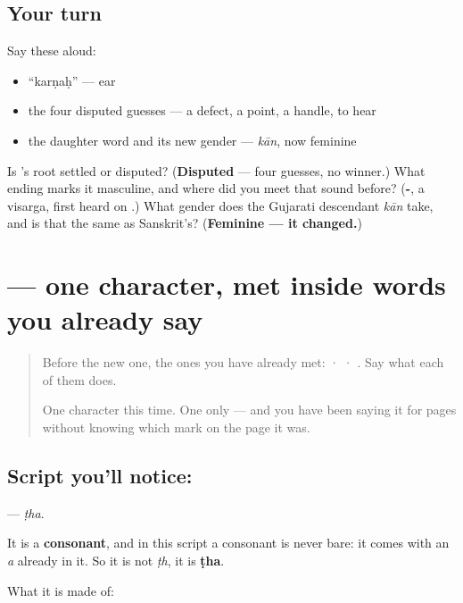 \subsection*{Your turn}
Say these aloud:

\begin{itemize}
\raggedright
  \item \textquotedblleft{}karṇaḥ\textquotedblright{} — ear
  \item the four disputed guesses — a defect, a point, a handle, to hear
  \item the daughter word and its new gender — \emph{kān}, now feminine
\end{itemize}

\begin{tcolorbox}[breakable,colback=teal!4,colframe=teal!35!black,title={Before you move on}]
Is 's root settled or disputed? (\textbf{Disputed} — four guesses, no winner.) What ending marks it masculine, and where did you meet that sound before? (\textbf{-}, a visarga, first heard on \textbf{}.) What gender does the Gujarati descendant \emph{kān} take, and is that the same as Sanskrit's? (\textbf{Feminine — it changed.})
\end{tcolorbox}
\section[\texorpdfstring{\sk{ठ} (ṭha)}{ठ (ṭha)}]{ — one character, met inside words you already say}

\label{lesson:SA-S117-letter-ttha}



\begin{quote}
Before the new one, the ones you have already met:  ·  · . Say what each of them does.

One character this time. One only — and you have been saying it for pages without knowing which mark on the page it was.
\end{quote}

\subsection*{Script you'll notice: }
\textbf{} — \emph{ṭha}.

It is a \textbf{consonant}, and in this script a consonant is never bare: it comes with an \emph{a} already in it. So it is not \emph{ṭh}, it is \textbf{ṭha}.

What it is made of:

